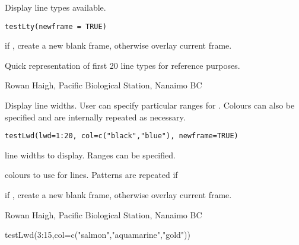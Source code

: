 \documentclass[letterpaper]{book}
\begin{document}
\begin{Description}\relax
Display line types available.
\end{Description}
\begin{Usage}
\begin{verbatim}
testLty(newframe = TRUE)
\end{verbatim}
\end{Usage}
\begin{Arguments}
\begin{ldescription}
\item[\code{newframe}] if , create a new blank frame, otherwise overlay current frame.
\end{ldescription}
\end{Arguments}
\begin{Note}\relax
Quick representation of first 20 line types for reference purposes.
\end{Note}
\begin{Author}\relax
Rowan Haigh, Pacific Biological Station, Nanaimo BC
\end{Author}

\begin{Description}\relax
Display line widths. User can specify particular ranges for . 
Colours can also be specified and are internally repeated as necessary.
\end{Description}
\begin{Usage}
\begin{verbatim}
testLwd(lwd=1:20, col=c("black","blue"), newframe=TRUE)
\end{verbatim}
\end{Usage}
\begin{Arguments}
\begin{ldescription}
\item[\code{lwd}] line widths to display. Ranges can be specified.
\item[\code{col}] colours to use for lines. Patterns are repeated if 
\item[\code{newframe}] if , create a new blank frame, otherwise overlay current frame.
\end{ldescription}
\end{Arguments}
\begin{Author}\relax
Rowan Haigh, Pacific Biological Station, Nanaimo BC
\end{Author}
\begin{Examples}
\begin{ExampleCode}
testLwd(3:15,col=c("salmon","aquamarine","gold"))
\end{ExampleCode}
\end{Examples}
\end{document}
